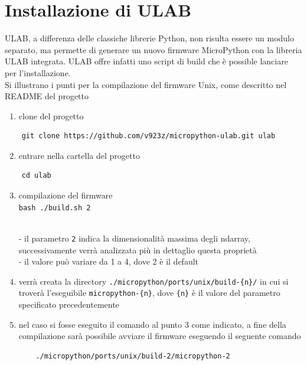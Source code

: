 \documentclass[12pt,a4paper]{report}
\begin{document}
\section{Installazione di ULAB}\label{installazione-di-ulab}

ULAB, a differenza delle classiche librerie Python, non risulta essere
un modulo separato, ma permette di generare un nuovo firmware
MicroPython con la libreria ULAB integrata. ULAB offre infatti uno
script di build che è possible lanciare per
l'installazione.\\
Si illustrano i punti per la compilazione del firmware Unix, come
descritto nel README del progetto \cite{ulab_compiling}

\begin{enumerate}
\item
  clone del progetto
\end{enumerate}

\begin{verbatim}
    git clone https://github.com/v923z/micropython-ulab.git ulab
\end{verbatim}

\begin{enumerate}
\setcounter{enumi}{1}
\item
  entrare nella cartella del progetto
\end{enumerate}
\begin{verbatim}
    cd ulab
\end{verbatim}

\begin{enumerate}
\setcounter{enumi}{2}
\item
  compilazione del firmware\\
  \texttt{bash\ ./build.sh\ 2\ }\strut \\
  - il parametro \texttt{2} indica la dimensionalità massima degli
  ndarray, successivamente verrà analizzata più in dettaglio questa
  proprietà\\
  - il valore può variare da 1 a 4, dove 2 è il default
\item
  verrà creata la directory
  \texttt{./micropython/ports/unix/build-\{n\}/} in cui si troverà
  l'eseguibile \texttt{micropython-\{n\}}, dove
  \texttt{\{n\}} è il valore del parametro specificato precedentemente
\item
  nel caso si fosse eseguito il comando al punto 3 come indicato, a fine
  della compilazione sarà possibile avviare il firmware eseguendo il
  seguente comando
\begin{verbatim}
    ./micropython/ports/unix/build-2/micropython-2
\end{verbatim}
\end{enumerate}
\end{document}
